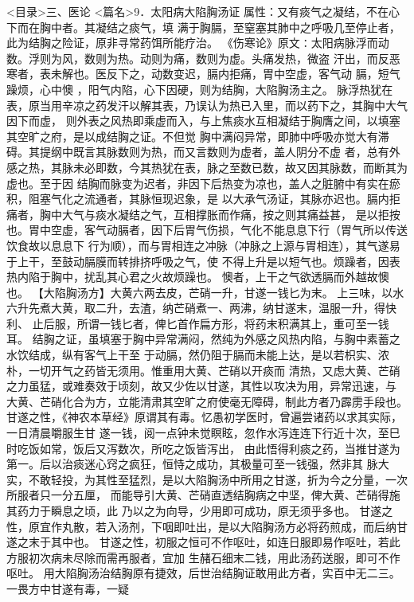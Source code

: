 \documentclass[a4paper,12pt,UTF8,twoside]{ctexbook}
\begin{document}
<目录>三、医论
<篇名>9．太阳病大陷胸汤证
属性：又有痰气之凝结，不在心下而在胸中者。其凝结之痰气，填 
满于胸膈，至窒塞其肺中之呼吸几至停止者，此为结胸之险证，原非寻常药饵所能疗治。 
《伤寒论》原文∶太阳病脉浮而动数。浮则为风，数则为热。动则为痛，数则为虚。头痛发热，微盗 
汗出，而反恶寒者，表未解也。医反下之，动数变迟，膈内拒痛，胃中空虚，客气动 
膈，短气躁烦，心中懊 ，阳气内陷，心下因硬，则为结胸，大陷胸汤主之。 
脉浮热犹在表，原当用辛凉之药发汗以解其表，乃误认为热已入里，而以药下之，其胸中大气因下而虚， 
则外表之风热即乘虚而入，与上焦痰水互相凝结于胸膺之间，以填塞其空旷之府，是以成结胸之证。不但觉 
胸中满闷异常，即肺中呼吸亦觉大有滞碍。其提纲中既言其脉数则为热，而又言数则为虚者，盖人阴分不虚 
者，总有外感之热，其脉未必即数，今其热犹在表，脉之至数已数，故又因其脉数，而断其为虚也。至于因 
结胸而脉变为迟者，非因下后热变为凉也，盖人之脏腑中有实在瘀积，阻塞气化之流通者，其脉恒现迟象，是 
以大承气汤证，其脉亦迟也。膈内拒痛者，胸中大气与痰水凝结之气，互相撑胀而作痛，按之则其痛益甚， 
是以拒按也。胃中空虚，客气动膈者，因下后胃气伤损，气化不能息息下行（胃气所以传送饮食故以息息下 
行为顺），而与胃相连之冲脉（冲脉之上源与胃相连），其气遂易于上干，至鼓动膈膜而转排挤呼吸之气，使 
不得上升是以短气也。烦躁者，因表热内陷于胸中，扰乱其心君之火故烦躁也。 
懊者，上干之气欲透膈而外越故懊 也。 
【大陷胸汤方】大黄六两去皮，芒硝一升，甘遂一钱匕为末。 
上三味，以水六升先煮大黄，取二升，去渣，纳芒硝煮一、两沸，纳甘遂末，温服一升，得快利、 
止后服，所谓一钱匕者，俾匕首作扁方形，将药末积满其上，重可至一钱耳。 
结胸之证，虽填塞于胸中异常满闷，然纯为外感之风热内陷，与胸中素蓄之水饮结成，纵有客气上干至 
于动膈，然仍阻于膈而未能上达，是以若枳实、浓朴，一切开气之药皆无须用。惟重用大黄、芒硝以开痰而 
清热，又虑大黄、芒硝之力虽猛，或难奏效于顷刻，故又少佐以甘遂，其性以攻决为用，异常迅速，与 
大黄、芒硝化合为方，立能清肃其空旷之府使毫无障碍，制此方者乃霹雳手段也。 
甘遂之性，《神农本草经》原谓其有毒。忆愚初学医时，曾遍尝诸药以求其实际，一日清晨嚼服生甘 
遂一钱，阅一点钟未觉瞑眩，忽作水泻连连下行近十次，至巳时吃饭如常，饭后又泻数次，所吃之饭皆泻出， 
由此悟得利痰之药，当推甘遂为第一。后以治痰迷心窍之疯狂，恒恃之成功，其极量可至一钱强，然非其 
脉大实，不敢轻投，为其性至猛烈，是以大陷胸汤中所用之甘遂，折为今之分量，一次所服者只一分五厘， 
而能导引大黄、芒硝直透结胸病之中坚，俾大黄、芒硝得施其药力于瞬息之顷，此 
乃以之为向导，少用即可成功，原无须乎多也。 
甘遂之性，原宜作丸散，若入汤剂，下咽即吐出，是以大陷胸汤方必将药煎成，而后纳甘遂之末于其中也。 
甘遂之性，初服之恒可不作呕吐，如连日服即易作呕吐，若此方服初次病未尽除而需再服者，宜加 
生赭石细末二钱，用此汤药送服，即可不作呕吐。 
用大陷胸汤治结胸原有捷效，后世治结胸证敢用此方者，实百中无二三。一畏方中甘遂有毒，一疑 
\end{document}
